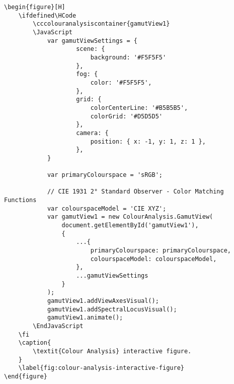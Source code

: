 \begin{lstlisting}[caption={\textit{Colour Analysis} interactive figure.}]
\begin{figure}[H]
    \ifdefined\HCode
        \cccolouranalysiscontainer{gamutView1}
        \JavaScript
            var gamutViewSettings = {
                    scene: {
                        background: '#F5F5F5'
                    },
                    fog: {
                        color: '#F5F5F5',
                    },
                    grid: {
                        colorCenterLine: '#B5B5B5',
                        colorGrid: '#D5D5D5'
                    },
                    camera: {
                        position: { x: -1, y: 1, z: 1 },
                    },
            }

            var primaryColourspace = 'sRGB';

            // CIE 1931 2° Standard Observer - Color Matching Functions
            var colourspaceModel = 'CIE XYZ';
            var gamutView1 = new ColourAnalysis.GamutView(
                document.getElementById('gamutView1'),
                {
                    ...{
                        primaryColourspace: primaryColourspace,
                        colourspaceModel: colourspaceModel,
                    },
                    ...gamutViewSettings
                }
            );
            gamutView1.addViewAxesVisual();
            gamutView1.addSpectralLocusVisual();
            gamutView1.animate();
        \EndJavaScript
    \fi
    \caption{
        \textit{Colour Analysis} interactive figure.
    }
    \label{fig:colour-analysis-interactive-figure}
\end{figure}
\end{lstlisting}

